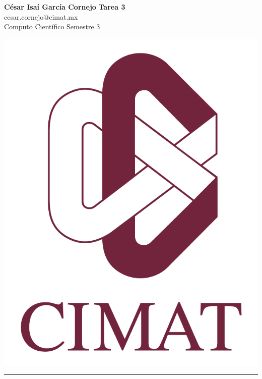 \documentclass[a4paper, 11pt]{article}
\begin{document}
	\noindent
	
	\begin{minipage}[b][1.2cm][t]{0.8\textwidth}
		\large\textbf{César Isaí García Cornejo} \hfill \textbf{Tarea 3}  \\
		cesar.cornejo@cimat.mx \hfill \\
		\normalsize Computo Científico \hfill Semestre 3\\
	\end{minipage}
	
	\hspace{14.4cm}
	\begin{minipage}[b][0.03cm][t]{0.12\linewidth}
		
		\vspace{-2.2cm}
		\includegraphics[scale=0.3]{Figures/EscudoCimat.png}
	\end{minipage}
	
	\noindent\rule{7in}{2.8pt}
	
\end{document}
